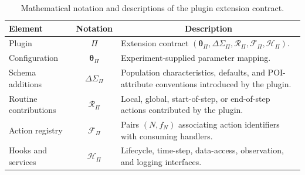 \begin{table}[ht]
\color{red}
\footnotesize
\centering
\caption{Mathematical notation and descriptions of the plugin extension contract.}
\label{tbl:notation_plugins}
\begin{tabularx}{\linewidth}{@{}lcX@{}}
\toprule
\textbf{Element} & \textbf{Notation} & \multicolumn{1}{c}{\textbf{Description}} \\ \midrule
Plugin & $\Pi$ & Extension contract $(\bm{\theta}_{\Pi},\Delta\Sigma_{\Pi},\mathcal{R}_{\Pi},\mathcal{F}_{\Pi},\mathcal{H}_{\Pi})$. \\ \midrule
Configuration & $\bm{\theta}_{\Pi}$ & Experiment-supplied parameter mapping. \\ \midrule
Schema additions & $\Delta\Sigma_{\Pi}$ & Population characteristics, defaults, and POI-attribute conventions introduced by the plugin. \\ \midrule
Routine contributions & $\mathcal{R}_{\Pi}$ & Local, global, start-of-step, or end-of-step actions contributed by the plugin. \\ \midrule
Action registry & $\mathcal{F}_{\Pi}$ & Pairs $(N,f_N)$ associating action identifiers with consuming handlers. \\ \midrule
Hooks and services & $\mathcal{H}_{\Pi}$ & Lifecycle, time-step, data-access, observation, and logging interfaces. \\ \bottomrule
\end{tabularx}
\end{table}




